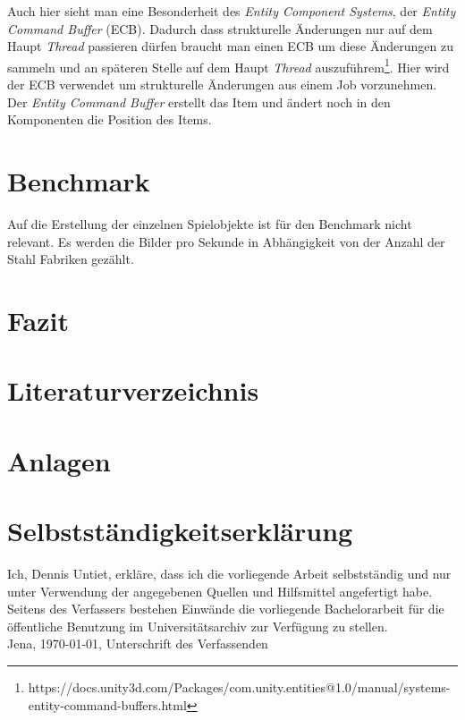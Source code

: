 \documentclass[12pt, titlepage]{article}
\DeclareRobustCommand{\#}{\adjustbox{valign=B,totalheight=.57\baselineskip}{\oldhash}}%
\begin{document}
Auch hier sieht man eine Besonderheit des \textit{Entity Component Systems}, der \textit{Entity Command Buffer} (ECB). Dadurch dass strukturelle Änderungen nur auf dem Haupt \textit{Thread} passieren dürfen braucht man einen ECB um diese Änderungen zu sammeln und an späteren Stelle auf dem Haupt \textit{Thread} auszuführem\footnote{https://docs.unity3d.com/Packages/com.unity.entities@1.0/manual/systems-entity-command-buffers.html}. Hier wird der ECB verwendet um strukturelle Änderungen aus einem Job vorzunehmen. Der \textit{Entity Command Buffer} erstellt das Item und ändert noch in den Komponenten die Position des Items.
\newpage
\section{Benchmark}
Auf die Erstellung der einzelnen Spielobjekte ist für den Benchmark nicht relevant. Es werden die Bilder pro Sekunde in Abhängigkeit von der Anzahl der Stahl Fabriken gezählt. 
\newpage
\section{Fazit}
\newpage 
\thispagestyle{empty}
\quad
\newpage
\lstlistoflistings
\newpage
\listoffigures
\newpage
\section{Literaturverzeichnis}



\newpage
\section{Anlagen}
\newpage
\thispagestyle{empty}
\section*{Selbstständigkeitserklärung}
Ich, Dennis Untiet, erkläre, dass ich die vorliegende Arbeit selbstständig und nur unter Verwendung der
angegebenen Quellen und Hilfsmittel angefertigt habe.\\
Seitens des Verfassers bestehen Einwände die vorliegende Bachelorarbeit für die öffentliche Benutzung im
Universitätsarchiv zur Verfügung zu stellen.\\
Jena, \today, Unterschrift des Verfassenden
\end{document}
